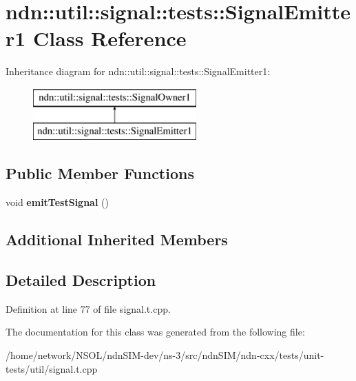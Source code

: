 \hypertarget{classndn_1_1util_1_1signal_1_1tests_1_1SignalEmitter1}{}\section{ndn\+:\+:util\+:\+:signal\+:\+:tests\+:\+:Signal\+Emitter1 Class Reference}
\label{classndn_1_1util_1_1signal_1_1tests_1_1SignalEmitter1}
Inheritance diagram for ndn\+:\+:util\+:\+:signal\+:\+:tests\+:\+:Signal\+Emitter1\+:\begin{figure}[H]
\begin{center}
\leavevmode
\includegraphics[height=2.000000cm]{classndn_1_1util_1_1signal_1_1tests_1_1SignalEmitter1}
\end{center}
\end{figure}
\subsection*{Public Member Functions}
\begin{DoxyCompactItemize}
\item 
void {\bfseries emit\+Test\+Signal} ()\hypertarget{classndn_1_1util_1_1signal_1_1tests_1_1SignalEmitter1_a362f1be099d0a4fabfc23d31e406c8da}{}\label{classndn_1_1util_1_1signal_1_1tests_1_1SignalEmitter1_a362f1be099d0a4fabfc23d31e406c8da}

\end{DoxyCompactItemize}
\subsection*{Additional Inherited Members}


\subsection{Detailed Description}


Definition at line 77 of file signal.\+t.\+cpp.



The documentation for this class was generated from the following file\+:\begin{DoxyCompactItemize}
\item 
/home/network/\+N\+S\+O\+L/ndn\+S\+I\+M-\/dev/ns-\/3/src/ndn\+S\+I\+M/ndn-\/cxx/tests/unit-\/tests/util/signal.\+t.\+cpp\end{DoxyCompactItemize}
